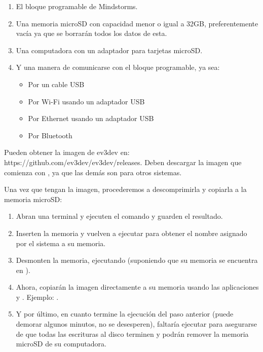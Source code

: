 \begin{enumerate}
  \item El bloque programable de Mindstorms.
  \item Una memoria microSD con capacidad menor o igual a 32GB, preferentemente vacía ya que se borrarán todos los datos de esta.
  \item Una computadora con un adaptador para tarjetas microSD.
  \item Y una manera de comunicarse con el bloque programable, ya sea:
      \begin{itemize}
        \item Por un cable USB
        \item Por Wi-Fi usando un adaptador USB
        \item Por Ethernet usando un adaptador USB
        \item Por Bluetooth
      \end{itemize}
\end{enumerate}

\noindent Pueden obtener la imagen de ev3dev en: https://github.com/ev3dev/ev3dev/releases. Deben descargar la imagen que comienza con , ya que las demás son para otros sistemas.

Una vez que tengan la imagen, procederemos a descomprimirla y copiarla a la memoria microSD:

\begin{enumerate}
  \item Abran una terminal y ejecuten el comando  y guarden el resultado.
  \item Inserten la memoria y vuelven a ejecutar  para obtener el nombre asignado por el sistema a su memoria.
  \item Desmonten la memoria, ejecutando  (suponiendo que su memoria se encuentra en  ).
  \item Ahora, copiarán la imagen directamente a su memoria usando las aplicaciones  y . Ejemplo: .
  \item Y por último, en cuanto termine la ejecución del paso anterior (puede demorar algunos minutos, no se desesperen), faltaría ejecutar  para asegurarse de que todas las escrituras al disco terminen y podrán remover la memoria microSD de su computadora.
\end{enumerate}



